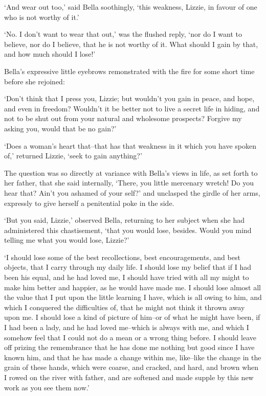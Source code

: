 ‘And wear out too,’ said Bella soothingly, ‘this weakness, Lizzie, in
favour of one who is not worthy of it.’

‘No. I don’t want to wear that out,’ was the flushed reply, ‘nor do I
want to believe, nor do I believe, that he is not worthy of it. What
should I gain by that, and how much should I lose!’

Bella’s expressive little eyebrows remonstrated with the fire for some
short time before she rejoined:

‘Don’t think that I press you, Lizzie; but wouldn’t you gain in peace,
and hope, and even in freedom? Wouldn’t it be better not to live a
secret life in hiding, and not to be shut out from your natural and
wholesome prospects? Forgive my asking you, would that be no gain?’

‘Does a woman’s heart that--that has that weakness in it which you have
spoken of,’ returned Lizzie, ‘seek to gain anything?’

The question was so directly at variance with Bella’s views in life, as
set forth to her father, that she said internally, ‘There, you little
mercenary wretch! Do you hear that? Ain’t you ashamed of your self?’
and unclasped the girdle of her arms, expressly to give herself a
penitential poke in the side.

‘But you said, Lizzie,’ observed Bella, returning to her subject when
she had administered this chastisement, ‘that you would lose, besides.
Would you mind telling me what you would lose, Lizzie?’

‘I should lose some of the best recollections, best encouragements,
and best objects, that I carry through my daily life. I should lose my
belief that if I had been his equal, and he had loved me, I should have
tried with all my might to make him better and happier, as he would have
made me. I should lose almost all the value that I put upon the little
learning I have, which is all owing to him, and which I conquered the
difficulties of, that he might not think it thrown away upon me. I
should lose a kind of picture of him--or of what he might have been,
if I had been a lady, and he had loved me--which is always with me, and
which I somehow feel that I could not do a mean or a wrong thing before.
I should leave off prizing the remembrance that he has done me nothing
but good since I have known him, and that he has made a change within
me, like--like the change in the grain of these hands, which were
coarse, and cracked, and hard, and brown when I rowed on the river with
father, and are softened and made supple by this new work as you see
them now.’

